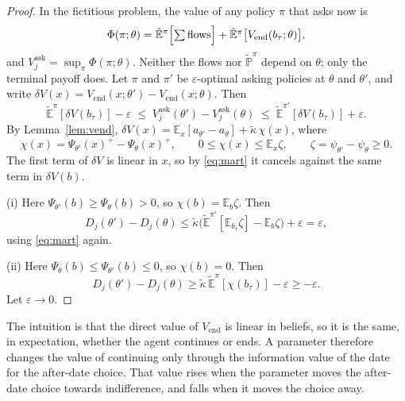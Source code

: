 \documentclass[11pt,a4paper]{article}
\theoremstyle{definition}
\theoremstyle{remark}
\newcommand{\E}{\mathbb{E}}
\newcommand{\Vend}{V_{\mathrm{end}}}
\newcommand{\kt}{\tilde\kappa}
\newcommand{\Pt}{\tilde{\mathbb P}}
\newcommand{\Et}{\tilde{\mathbb E}}
\begin{document}
\begin{proof}
In the fictitious problem, the value of any policy $\pi$ that asks now is
\[
\Phi(\pi;\theta)=\Et^{\pi}\Bigl[\textstyle\sum\text{flows}\Bigr]+\Et^{\pi}\bigl[\Vend(b_\tau;\theta)\bigr],
\]
and $V_j^{\mathrm{ask}}=\sup_\pi\Phi(\pi;\theta)$.
Neither the flows nor $\Pt^{\pi}$ depend on $\theta$; only the terminal payoff does. Let $\pi$ and $\pi'$ be $\varepsilon$-optimal asking policies at $\theta$ and $\theta'$, and write $\delta V(x)=\Vend(x;\theta')-\Vend(x;\theta)$. Then
\[
\Et^{\pi}[\delta V(b_\tau)]-\varepsilon\;\le\;V_j^{\mathrm{ask}}(\theta')-V_j^{\mathrm{ask}}(\theta)\;\le\;\Et^{\pi'}[\delta V(b_\tau)]+\varepsilon.
\]
By Lemma~\ref{lem:vend}, $\delta V(x)=\E_x[a_{\theta'}-a_\theta]+\kt\,\chi(x)$, where
\[
\chi(x)=\Psi_{\theta'}(x)^+-\Psi_\theta(x)^+,\qquad 0\le\chi(x)\le\E_x\zeta,\qquad \zeta=\psi_{\theta'}-\psi_\theta\ge0.
\]
The first term of $\delta V$ is linear in $x$, so by \eqref{eq:mart} it cancels against the same term in $\delta V(b)$.

(i) Here $\Psi_{\theta'}(b)\ge\Psi_\theta(b)>0$, so $\chi(b)=\E_b\zeta$. Then
\[
D_j(\theta')-D_j(\theta)\le\kt\bigl(\Et^{\pi'}[\E_{b_\tau}\zeta]-\E_b\zeta\bigr)+\varepsilon=\varepsilon,
\]
using \eqref{eq:mart} again.

(ii) Here $\Psi_\theta(b)\le\Psi_{\theta'}(b)\le0$, so $\chi(b)=0$. Then
\[
D_j(\theta')-D_j(\theta)\ge\kt\,\Et^{\pi}[\chi(b_\tau)]-\varepsilon\ge-\varepsilon.
\]
Let $\varepsilon\to0$.
\end{proof}

The intuition is that the direct value of $\Vend$ is linear in beliefs, so it is the same, in expectation, whether the agent continues or ends. A parameter therefore changes the value of continuing only through the information value of the date for the after-date choice. That value rises when the parameter moves the after-date choice towards indifference, and falls when it moves the choice away.
\end{document}
